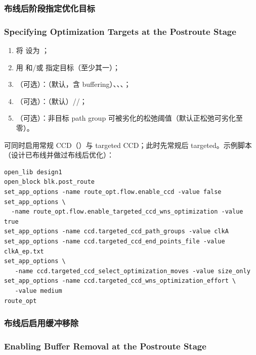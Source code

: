 \subsubsection{布线后阶段指定优化目标}
\subsubsection*{Specifying Optimization Targets at the Postroute Stage}

\begin{enumerate}
  \item 将  设为 ；
  \item 用  和/或  指定目标（至少其一）；
  \item （可选）：（默认，含 buffering）、、、；
  \item （可选）：（默认）//；
  \item （可选）：非目标 path group 可被劣化的松弛阈值（默认正松弛可劣化至零）。
\end{enumerate}
可同时启用常规 CCD（）与 targeted CCD；此时先常规后 targeted。示例脚本（设计已布线并做过布线后优化）：
\begin{lstlisting}
open_lib design1
open_block blk.post_route
set_app_options -name route_opt.flow.enable_ccd -value false
set_app_options \
  -name route_opt.flow.enable_targeted_ccd_wns_optimization -value true
set_app_options -name ccd.targeted_ccd_path_groups -value clkA
set_app_options -name ccd.targeted_ccd_end_points_file -value clkA_ep.txt
set_app_options \
   -name ccd.targeted_ccd_select_optimization_moves -value size_only
set_app_options -name ccd.targeted_ccd_wns_optimization_effort \
   -value medium
route_opt
\end{lstlisting}

\subsubsection{布线后启用缓冲移除}
\subsubsection*{Enabling Buffer Removal at the Postroute Stage}

